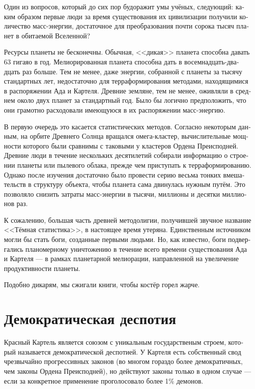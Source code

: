 \documentclass[a4paper,12pt,fleqn]{book}\usepackage{cooltooltips}\usepackage{polyglossia}\setdefaultlanguage[babelshorthands=true]{russian}\setotherlanguage{english}\defaultfontfeatures{Ligatures=TeX,Mapping=tex-text} \usepackage{xcolor}\definecolor{lightgray}{HTML}{bbbbbb}\color{lightgray}\newcommand{\ml}[3]{\textenglish{\textcolor{black}{#3}}}
\begin{document}
{Один из вопросов, который до сих пор будоражит умы учёных, следующий: каким образом первые люди за время существования их цивилизации получили количество масс-энергии, достаточное для преобразования почти сорока тысяч планет в обитаемой Вселенной?

Ресурсы планеты не бесконечны.
Обычная, <<дикая>> планета способна давать 63 гигаяо в год.
Мелиорированная планета способна дать в восемнадцать-двадцать раз больше.
Тем не менее, даже энергии, собранной с планеты за тысячу стандартных лет, недостаточно для терраформирования методами, находящимися в распоряжении Ада и Картеля.
Древние земляне, тем не менее, оживляли в среднем около двух планет за стандартный год.
Было бы логично предположить, что они грамотно расходовали имеющуюся в их распоряжении масс-энергию.

В первую очередь это касается статистических методов.
Согласно некоторым данным, на орбите Древнего Солнца вращался омега-кластер, вычислительные мощности которого были сравнимы с таковыми у кластеров Ордена Преисподней.
Древние люди в течение нескольких десятилетий собирали информацию о строении планеты или пылевого облака, прежде чем приступать к терраформированию.
Однако после изучения достаточно было провести серию весьма тонких вмешательств в структуру объекта, чтобы планета сама двинулась нужным путём.
Это позволяло снизить затраты масс-энергии в тысячи, миллионы и десятки миллионов раз.

К сожалению, большая часть древней методолигии, получившей звучное название <<Тёмная статистика>>, в настоящее время утеряна.
Единственным источником могли бы стать боги, созданные первыми людьми.
Но, как известно, боги подвергались планомерному уничтожению в течение всего времени существования Ада и Картеля --- в рамках планетарной мелиорации, направленной на увеличение продуктивности планеты.

Подобно дикарям, мы сжигали книги, чтобы костёр горел жарче.

\section{Демократическая деспотия}

Красный Картель является союзом с уникальным государственым строем, который называется демократической деспотией.
У Картеля есть собственный свод чрезвычайно прогрессивных законов (во многом гораздо более демократичных, чем законы Ордена Преисподней), но действуют законы только в одном случае --- если за конкретное применение проголосовало более 1\% демонов.

}
\end{document}

